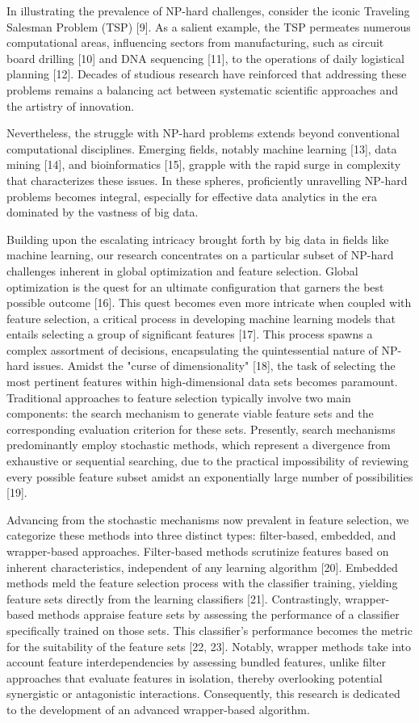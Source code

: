 \documentclass{article} %
\begin{document}
In illustrating the prevalence of NP-hard challenges, consider the iconic Traveling Salesman Problem (TSP) [9]. As a salient example, the TSP permeates numerous computational areas, influencing sectors from manufacturing, such as circuit board drilling [10] and DNA sequencing [11], to the operations of daily logistical planning [12]. Decades of studious research have reinforced that addressing these problems remains a balancing act between systematic scientific approaches and the artistry of innovation.

Nevertheless, the struggle with NP-hard problems extends beyond conventional computational disciplines. Emerging fields, notably machine learning [13], data mining [14], and bioinformatics [15], grapple with the rapid surge in complexity that characterizes these issues. In these spheres, proficiently unravelling NP-hard problems becomes integral, especially for effective data analytics in the era dominated by the vastness of big data.

Building upon the escalating intricacy brought forth by big data in fields like machine learning, our research concentrates on a particular subset of NP-hard challenges inherent in global optimization and feature selection. Global optimization is the quest for an ultimate configuration that garners the best possible outcome [16]. This quest becomes even more intricate when coupled with feature selection, a critical process in developing machine learning models that entails selecting a group of significant features [17]. This process spawns a complex assortment of decisions, encapsulating the quintessential nature of NP-hard issues. Amidst the "curse of dimensionality" [18], the task of selecting the most pertinent features within high-dimensional data sets becomes paramount. Traditional approaches to feature selection typically involve two main components: the search mechanism to generate viable feature sets and the corresponding evaluation criterion for these sets. Presently, search mechanisms predominantly employ stochastic methods, which represent a divergence from exhaustive or sequential searching, due to the practical impossibility of reviewing every possible feature subset amidst an exponentially large number of possibilities [19].

Advancing from the stochastic mechanisms now prevalent in feature selection, we categorize these methods into three distinct types: filter-based, embedded, and wrapper-based approaches. Filter-based methods scrutinize features based on inherent characteristics, independent of any learning algorithm [20]. Embedded methods meld the feature selection process with the classifier training, yielding feature sets directly from the learning classifiers [21]. Contrastingly, wrapper-based methods appraise feature sets by assessing the performance of a classifier specifically trained on those sets. This classifier's performance becomes the metric for the suitability of the feature sets [22, 23]. Notably, wrapper methods take into account feature interdependencies by assessing bundled features, unlike filter approaches that evaluate features in isolation, thereby overlooking potential synergistic or antagonistic interactions. Consequently, this research is dedicated to the development of an advanced wrapper-based algorithm.
\end{document}
